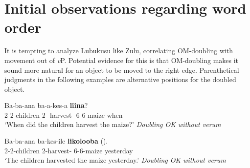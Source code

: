\documentclass[output=paper]{langscibook}
\begin{document}
\section{Initial observations regarding word order} \label{SectWordOrder}

It is tempting to analyze Lubukusu like Zulu, correlating OM-doubling with movement out of \textit{v}P. Potential evidence for this is that OM-doubling makes it sound more natural for an object to be moved to the right edge. Parenthetical judgments in the following examples are alternative positions for the doubled object.
    
\ea 
\begin{xlist}

\ex 
\gll Ba-ba-ana ba-a-kes-a  \textbf{liina}? \\
2-2-children 2\Sm-\Om-harvest-\Fv{} 6-6-maize when \\
\glt `When did the children harvest the maize?’ \textit{Doubling OK without verum}

\ex
\gll Ba-ba-ana ba-kes-ile  \textbf{likolooba} (\Checkmark). \\
2-2-children 2\Om-harvest-\Pfv{} 6-6-maize yesterday \\
\glt `The children harvested the maize yesterday.’ \textit{Doubling OK without verum}


\end{xlist}
\z


    


\end{document}
